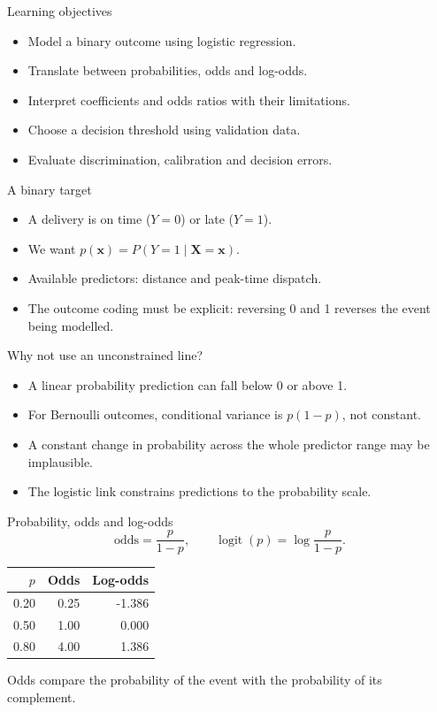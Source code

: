 \begin{frame}{Learning objectives}
\begin{itemize}
\item Model a binary outcome using logistic regression.
\item Translate between probabilities, odds and log-odds.
\item Interpret coefficients and odds ratios with their limitations.
\item Choose a decision threshold using validation data.
\item Evaluate discrimination, calibration and decision errors.
\end{itemize}
\end{frame}

\begin{frame}{A binary target}
\begin{itemize}
\item A delivery is on time ($Y=0$) or late ($Y=1$).
\item We want $p(\mathbf x)=P(Y=1\mid\mathbf X=\mathbf x)$.
\item Available predictors: distance and peak-time dispatch.
\item The outcome coding must be explicit: reversing 0 and 1 reverses the event being modelled.
\end{itemize}
\end{frame}

\begin{frame}{Why not use an unconstrained line?}
\begin{itemize}
\item A linear probability prediction can fall below 0 or above 1.
\item For Bernoulli outcomes, conditional variance is $p(1-p)$, not constant.
\item A constant change in probability across the whole predictor range may be implausible.
\item The logistic link constrains predictions to the probability scale.
\end{itemize}
\end{frame}

\begin{frame}{Probability, odds and log-odds}
\[\text{odds}=\frac{p}{1-p},\qquad\operatorname{logit}(p)=\log\frac{p}{1-p}.\]\begin{center}\begin{tabular}{rrr}\toprule
$p$ & Odds & Log-odds\\\midrule 0.20 & 0.25 & -1.386\\0.50 & 1.00 & 0.000\\0.80 & 4.00 & 1.386\\
\bottomrule\end{tabular}\end{center}Odds compare the probability of the event with the probability of its complement.
\end{frame}

